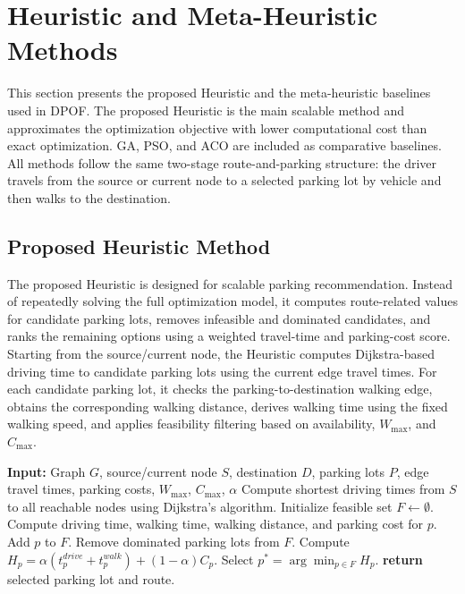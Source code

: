 \section{Heuristic and Meta-Heuristic Methods}

This section presents the proposed Heuristic and the meta-heuristic baselines used in DPOF. The proposed Heuristic is the main scalable method and approximates the optimization objective with lower computational cost than exact optimization. GA, PSO, and ACO are included as comparative baselines. All methods follow the same two-stage route-and-parking structure: the driver travels from the source or current node to a selected parking lot by vehicle and then walks to the destination.

\subsection{Proposed Heuristic Method}

The proposed Heuristic is designed for scalable parking recommendation. Instead of repeatedly solving the full optimization model, it computes route-related values for candidate parking lots, removes infeasible and dominated candidates, and ranks the remaining options using a weighted travel-time and parking-cost score. Starting from the source/current node, the Heuristic computes Dijkstra-based driving time to candidate parking lots using the current edge travel times. For each candidate parking lot, it checks the parking-to-destination walking edge, obtains the corresponding walking distance, derives walking time using the fixed walking speed, and applies feasibility filtering based on availability, \(W_{\max}\), and \(C_{\max}\).

\begin{algorithm}[t]
\caption{Proposed Heuristic Method}
\label{alg:heuristic_method}
\begin{algorithmic}[1]
\STATE \textbf{Input:} Graph \(G\), source/current node \(S\), destination \(D\), parking lots \(P\), edge travel times, parking costs, \(W_{\max}\), \(C_{\max}\), \(\alpha\)
\STATE Compute shortest driving times from \(S\) to all reachable nodes using Dijkstra's algorithm.
\STATE Initialize feasible set \(F \leftarrow \emptyset\).
\STATE Compute driving time, walking time, walking distance, and parking cost for \(p\).
\STATE Add \(p\) to \(F\).
\ENDIF
\ENDFOR
\STATE Remove dominated parking lots from \(F\).
\STATE Compute \(H_p=\alpha(t^{drive}_{p}+t^{walk}_{p})+(1-\alpha)C_p\).
\ENDFOR
\STATE Select \(p^*=\arg\min_{p\in F} H_p\).
\STATE \textbf{return} selected parking lot and route.
\end{algorithmic}
\end{algorithm}

